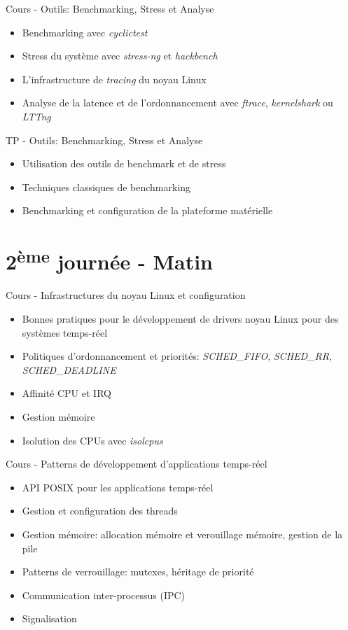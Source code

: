 \documentclass[a4paper,12pt,obeyspaces,spaces,hyphens]{article}
\begin{document}
\feagendatwocolumn
{Cours - Outils: Benchmarking, Stress et Analyse}
{
  \begin{itemize}
  \item Benchmarking avec {\em cyclictest}
  \item Stress du système avec {\em stress-ng} et {\em hackbench}
  \item L'infrastructure de {\em tracing} du noyau Linux
  \item Analyse de la latence et de l'ordonnancement avec {\em
      ftrace}, {\em kernelshark} ou {\em LTTng}
  \end{itemize}
}
{TP - Outils: Benchmarking, Stress et Analyse}
{
  \begin{itemize}
  \item Utilisation des outils de benchmark et de stress
  \item Techniques classiques de benchmarking
  \item Benchmarking et configuration de la plateforme matérielle
  \end{itemize}
}

\section{2\textsuperscript{ème} journée - Matin}

\feagendaonecolumn
{Cours - Infrastructures du noyau Linux et configuration}
{
  \begin{itemize}
  \item Bonnes pratiques pour le développement de drivers noyau Linux
    pour des systèmes temps-réel
  \item Politiques d'ordonnancement et priorités: {\em SCHED\_FIFO},
    {\em SCHED\_RR}, {\em SCHED\_DEADLINE}
  \item Affinité CPU et IRQ
  \item Gestion mémoire
  \item Isolution des CPUs avec {\em isolcpus}
  \end{itemize}
}

\feagendaonecolumn
{Cours - Patterns de développement d'applications temps-réel}
{
  \begin{itemize}
  \item API POSIX pour les applications temps-réel
  \item Gestion et configuration des threads
  \item Gestion mémoire: allocation mémoire et verouillage mémoire, gestion de la pile
  \item Patterns de verrouillage: mutexes, héritage de priorité
  \item Communication inter-processus (IPC)
  \item Signalisation
  \end{itemize}
}
\end{document}
